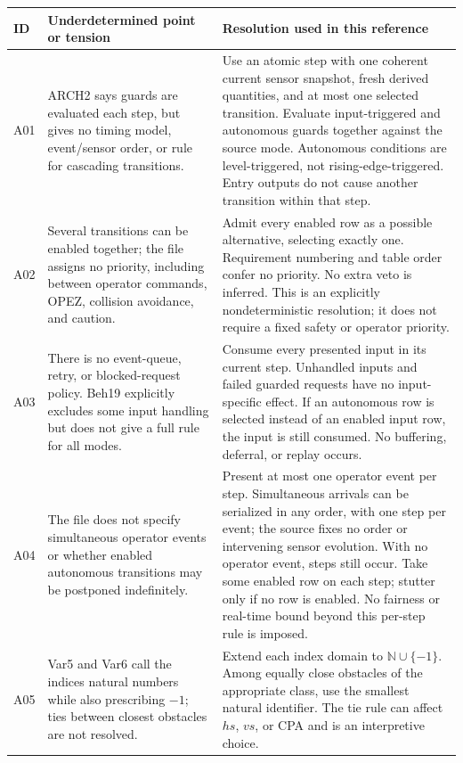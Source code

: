 \documentclass[10pt,a4paper]{article}
\begin{document}
\begin{longtable}{@{}L{0.07\textwidth}L{0.40\textwidth}L{0.45\textwidth}@{}}
\toprule
\textbf{ID} & \textbf{Underdetermined point or tension} & \textbf{Resolution used in this reference} \\
\midrule
\endhead

A01 & ARCH2 says guards are evaluated each step, but gives no timing model, event/sensor order, or rule for cascading transitions. & Use an atomic step with one coherent current sensor snapshot, fresh derived quantities, and at most one selected transition. Evaluate input-triggered and autonomous guards together against the source mode. Autonomous conditions are level-triggered, not rising-edge-triggered. Entry outputs do not cause another transition within that step. \\
A02 & Several transitions can be enabled together; the file assigns no priority, including between operator commands, OPEZ, collision avoidance, and caution. & Admit every enabled row as a possible alternative, selecting exactly one. Requirement numbering and table order confer no priority. No extra veto is inferred. This is an explicitly nondeterministic resolution; it does not require a fixed safety or operator priority. \\
A03 & There is no event-queue, retry, or blocked-request policy. Beh19 explicitly excludes some input handling but does not give a full rule for all modes. & Consume every presented input in its current step. Unhandled inputs and failed guarded requests have no input-specific effect. If an autonomous row is selected instead of an enabled input row, the input is still consumed. No buffering, deferral, or replay occurs. \\
A04 & The file does not specify simultaneous operator events or whether enabled autonomous transitions may be postponed indefinitely. & Present at most one operator event per step. Simultaneous arrivals can be serialized in any order, with one step per event; the source fixes no order or intervening sensor evolution. With no operator event, steps still occur. Take some enabled row on each step; stutter only if no row is enabled. No fairness or real-time bound beyond this per-step rule is imposed. \\
A05 & Var5 and Var6 call the indices natural numbers while also prescribing $-1$; ties between closest obstacles are not resolved. & Extend each index domain to $\mathbb{N} \cup  \{-1\}$. Among equally close obstacles of the appropriate class, use the smallest natural identifier. The tie rule can affect $\mathit{hs}$, $\mathit{vs}$, or CPA and is an interpretive choice. \\

\end{longtable}
\end{document}
